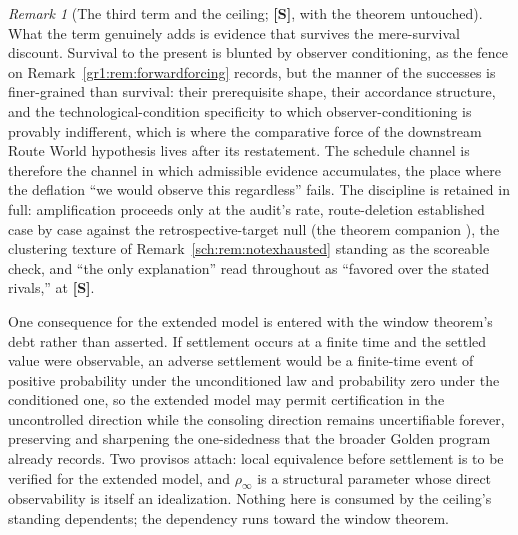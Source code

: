 \documentclass[11pt]{article}
\theoremstyle{plain}
\theoremstyle{definition}
\theoremstyle{remark}
\newtheorem{remark}[theorem]{Remark}
\begin{document}
\begin{remark}[The third term and the ceiling; \textbf{[S]}, with the
theorem untouched]
What the term genuinely adds is evidence that survives the
mere-survival discount. Survival to the present is blunted by
observer conditioning, as the fence on
Remark~\ref{gr1:rem:forwardforcing} records, but the manner of the
successes is finer-grained than survival: their prerequisite shape,
their accordance structure, and the technological-condition
specificity to which observer-conditioning is provably indifferent,
which is where the comparative force of
the downstream Route World hypothesis lives after its restatement. The
schedule channel is therefore the channel in which admissible
evidence accumulates, the place where the deflation ``we would
observe this regardless'' fails. The discipline is retained in full:
amplification proceeds only at the audit's rate, route-deletion
established case by case against the retrospective-target null
(the theorem companion \cite{TargetedB1}), the clustering texture of
Remark~\ref{sch:rem:notexhausted} standing as the scoreable check,
and ``the only explanation'' read throughout as ``favored over the
stated rivals,'' at \textbf{[S]}.

One consequence for the extended model is entered with the window
theorem's debt rather than asserted. If settlement occurs at a
finite time and the settled value were observable, an adverse
settlement would be a finite-time event of positive probability
under the unconditioned law and probability zero under the
conditioned one, so the extended model may permit certification in
the uncontrolled direction while the consoling direction remains
uncertifiable forever, preserving and sharpening the one-sidedness
that the broader Golden program already records. Two provisos
attach: local equivalence before settlement is to be verified for
the extended model, and $\rho_\infty$ is a structural parameter
whose direct observability is itself an idealization. Nothing here
is consumed by the ceiling's standing dependents; the dependency
runs toward the window theorem.
\end{remark}
\end{document}
